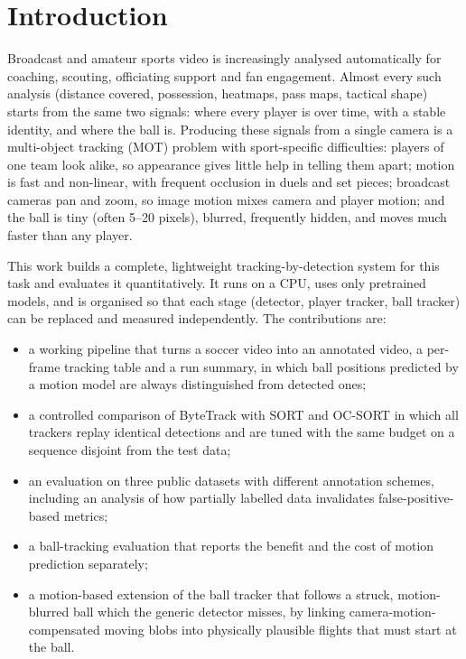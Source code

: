 \documentclass[conference]{IEEEtran}
\begin{document}
\section{Introduction}
Broadcast and amateur sports video is increasingly analysed automatically for
coaching, scouting, officiating support and fan engagement. Almost every such
analysis (distance covered, possession, heatmaps, pass maps, tactical shape)
starts from the same two signals: where every player is over time, with a stable
identity, and where the ball is. Producing these signals from a single camera is
a multi-object tracking (MOT) problem with sport-specific difficulties: players
of one team look alike, so appearance gives little help in telling them apart;
motion is fast and non-linear, with frequent occlusion in duels and set pieces;
broadcast cameras pan and zoom, so image motion mixes camera and player motion;
and the ball is tiny (often 5--20 pixels), blurred, frequently hidden, and moves
much faster than any player.

This work builds a complete, lightweight tracking-by-detection system for this
task and evaluates it quantitatively. It runs on a CPU, uses only pretrained
models, and is organised so that each stage (detector, player tracker, ball
tracker) can be replaced and measured independently. The contributions are:
\begin{itemize}
\item a working pipeline that turns a soccer video into an annotated video, a
per-frame tracking table and a run summary, in which ball positions predicted by
a motion model are always distinguished from detected ones;
\item a controlled comparison of ByteTrack with SORT and OC-SORT in which all
trackers replay identical detections and are tuned with the same budget on a
sequence disjoint from the test data;
\item an evaluation on three public datasets with different annotation schemes,
including an analysis of how partially labelled data invalidates
false-positive-based metrics;
\item a ball-tracking evaluation that reports the benefit and the cost of motion
prediction separately;
\item a motion-based extension of the ball tracker that follows a struck,
motion-blurred ball which the generic detector misses, by linking
camera-motion-compensated moving blobs into physically plausible flights that must
start at the ball.
\end{itemize}
\end{document}
